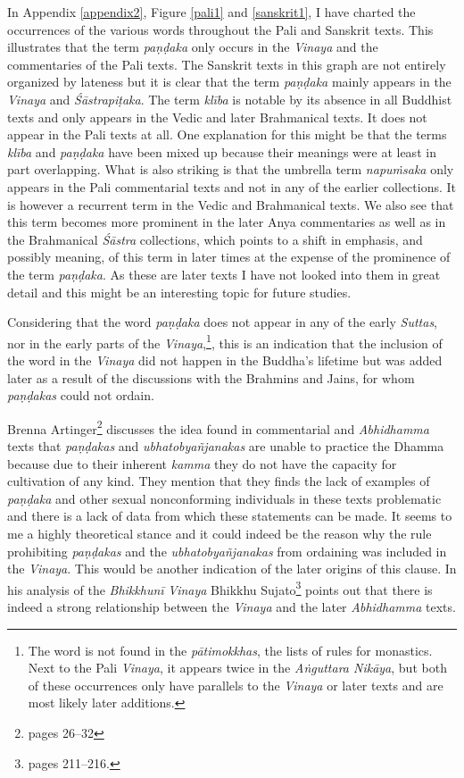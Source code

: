 In Appendix \ref{appendix2}, Figure \ref{pali1} and \ref{sanskrit1}, I have charted the occurrences of the various words throughout the Pali and Sanskrit texts. This illustrates that the term {\em paṇḍaka} only occurs in the {\em Vinaya} and the commentaries of the Pali texts. The Sanskrit texts in this graph are not entirely organized by lateness but it is clear that the term {\em paṇḍaka} mainly appears in the {\em Vinaya} and {\em Śāstrapiṭaka}. The term {\em klība} is notable by its absence in all Buddhist texts and only appears in the Vedic and later Brahmanical texts. It does not appear in the Pali texts at all. One explanation for this might be that the terms {\em klība} and {\em paṇḍaka} have been mixed up because their meanings were at least in part overlapping. What is also striking is that the umbrella term {\em napuṁsaka} only appears in the Pali commentarial texts and not in any of the earlier collections. It is however a recurrent term in the Vedic and Brahmanical texts. We also see that this term becomes more prominent in the later Anya commentaries as well as in the Brahmanical {\em Śāstra} collections, which points to a shift in emphasis, and possibly meaning, of this term in later times at the expense of the prominence of the term {\em paṇḍaka}. As these are later texts I have not looked into them in great detail and this might be an interesting topic for future studies.

Considering that the word {\em paṇḍaka} does not appear in any of the early {\em Suttas}, nor in the early parts of the {\em Vinaya},\footnote{The word is not found in the {\em pātimokkhas}, the lists of rules for monastics. Next to the Pali {\em Vinaya}, it appears twice in the {\em Aṅguttara Nikāya}, but both of these occurrences only have parallels to the {\em Vinaya} or later texts and are most likely later additions.}, this is an indication that the inclusion of the word in the {\em Vinaya} did not happen in the Buddha's lifetime but was added later as a result of the discussions with the Brahmins and Jains, for whom {\em paṇḍakas} could not ordain.

Brenna Artinger\footnote{\cite{artinger} pages 26–32} discusses the idea found in commentarial and {\em Abhidhamma} texts that {\em paṇḍakas} and {\em ubhatob­yañ­janakas} are unable to practice the Dhamma because due to their inherent {\em kamma} they do not have the capacity for cultivation of any kind. They mention that they finds the lack of examples of {\em paṇḍaka} and other sexual nonconforming individuals in these texts problematic and there is a lack of data from which these statements can be made. It seems to me a highly theoretical stance and it could indeed be the reason why the rule prohibiting {\em paṇḍakas} and the {\em ubhatob­yañ­janakas} from ordaining was included in the {\em Vinaya}. This would be another indication of the later origins of this clause. In his analysis of the {\em Bhikkhunī} {\em Vinaya} Bhikkhu Sujato\footnote{\cite{sujato2009} pages 211–216.} points out that there is indeed a strong relationship between the {\em Vinaya} and the later {\em Abhidhamma} texts.

